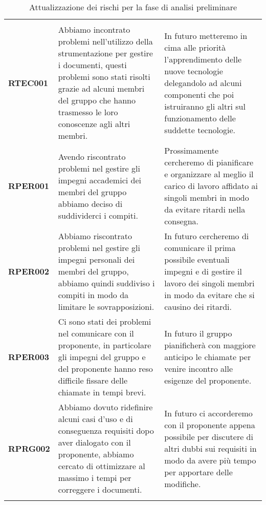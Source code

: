 \documentclass[../piano-di-progetto]{subfiles}
\begin{document}
\begin{longtable}[H]{|p{10em}|p{17em}|p{17em}|}
  \rowcolor{darkgray!90!}
  \multicolumn{1}{c}{\color{white}{\textbf{Rischio}}} & \multicolumn{1}{c}{\color{white}{\textbf{Gestione}}}                                                                                                                                                                    & \multicolumn{1}{c}{\color{white}{\textbf{Monitoraggio}}}                                                                                                                                     \\
  \textbf{RTEC001}                                    & Abbiamo incontrato problemi nell'utilizzo della strumentazione per gestire i documenti, questi problemi sono stati risolti grazie ad alcuni membri del gruppo che hanno trasmesso le loro conoscenze agli altri membri. & In futuro metteremo in cima alle priorità l'apprendimento delle nuove tecnologie delegandolo ad alcuni componenti che poi istruiranno gli altri sul funzionamento delle suddette tecnologie. \\
  \textbf{RPER001}                                    & Avendo riscontrato problemi nel gestire gli impegni accademici dei membri del gruppo abbiamo deciso di suddividerci i compiti.                                                                                          & Prossimamente cercheremo di pianificare e organizzare al meglio il carico di lavoro affidato ai singoli membri in modo da evitare ritardi nella consegna.                                    \\
  \textbf{RPER002}                                    & Abbiamo riscontrato problemi nel gestire gli impegni personali dei membri del gruppo, abbiamo quindi suddiviso i compiti in modo da limitare le sovrapposizioni.                                                        & In futuro cercheremo di comunicare il prima possibile eventuali impegni e di gestire il lavoro dei singoli membri in modo da evitare che si causino dei ritardi.                             \\
  \textbf{RPER003}                                    & Ci sono stati dei problemi nel comunicare con il proponente, in particolare gli impegni del gruppo e del proponente hanno reso difficile fissare delle chiamate in tempi brevi.                                         & In futuro il gruppo pianificherà con maggiore anticipo le chiamate per venire incontro alle esigenze del proponente.                                                                         \\
  \textbf{RPRG002}                                    & Abbiamo dovuto ridefinire alcuni casi d'uso e di conseguenza requisiti dopo aver dialogato con il proponente, abbiamo cercato di ottimizzare al massimo i tempi per correggere i documenti.                             & In futuro ci accorderemo con il proponente appena possibile per discutere di altri dubbi sui requisiti in modo da avere più tempo per apportare delle modifiche.                             \\
  \rowcolor{white}
  \caption{Attualizzazione dei rischi per la fase di analisi preliminare}%
  \label{tab:attualizzazione_fase_analisi_preliminare}
\end{longtable}
\end{document}
